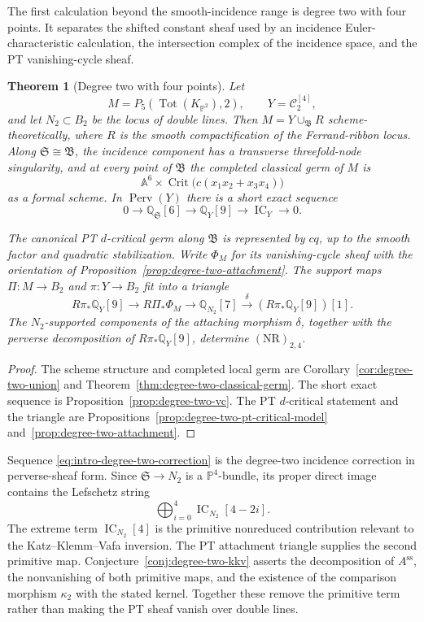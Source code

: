 \documentclass[11pt,reqno]{amsart}
\newtheorem{theorem}{Theorem}[section]
\theoremstyle{definition}
\newcommand{\Q}{\mathbb Q}
\newcommand{\Pp}{\mathbb P}
\newcommand{\IC}{\operatorname{IC}}
\newcommand{\Tot}{\operatorname{Tot}}
\begin{document}
The first calculation beyond the smooth-incidence range is degree two with
four points.  It separates the shifted constant sheaf used by an incidence
Euler-characteristic calculation, the intersection complex of the incidence
space, and the PT vanishing-cycle sheaf.

\begin{theorem}[Degree two with four points]
\label{thm:intro-degree-two}
Let
\[
 M=P_5(\Tot(K_{\Pp^2}),2),\qquad Y=\mathcal C_2^{[4]},
\]
and let $N_2\subset B_2$ be the locus of double lines.
Then $M=Y\cup_{\mathfrak B}R$ scheme-theoretically, where $R$ is the smooth
compactification of the Ferrand-ribbon locus.  Along
$\mathfrak S\cong\mathfrak B$, the incidence component has a transverse
threefold-node singularity, and at every point of $\mathfrak B$ the
completed classical germ of $M$ is
\[
 \mathbb A^6\times
 \operatorname{Crit}\bigl(c(x_1x_2+x_3x_4)\bigr)
\]
as a formal scheme.  In $\operatorname{Perv}(Y)$ there is a short exact sequence
\begin{equation}\label{eq:intro-degree-two-correction}
 0\longrightarrow\Q_{\mathfrak S}[6]
 \longrightarrow\Q_Y[9]
 \longrightarrow\IC_Y\longrightarrow0.
\end{equation}

The canonical PT $d$-critical germ along $\mathfrak B$ is represented by
$cq$, up to the smooth factor and quadratic stabilization.  Write $\Phi_M$
for its vanishing-cycle sheaf with the orientation of
Proposition~\ref{prop:degree-two-attachment}.  The support maps
$\Pi:M\to B_2$ and $\pi:Y\to B_2$ fit into a triangle
\[
 R\pi_*\Q_Y[9]\longrightarrow R\Pi_*\Phi_M
 \longrightarrow\Q_{N_2}[7]
 \xrightarrow{\delta}(R\pi_*\Q_Y[9])[1].
\]
The $N_2$-supported components of the attaching morphism $\delta$, together
with the perverse decomposition of $R\pi_*\Q_Y[9]$, determine
$(\mathrm{NR})_{2,4}$.
\end{theorem}

\begin{proof}
The scheme structure and completed local germ are
Corollary~\ref{cor:degree-two-union} and
Theorem~\ref{thm:degree-two-classical-germ}.  The short exact sequence is
Proposition~\ref{prop:degree-two-vc}.  The PT $d$-critical statement and
the triangle are
Propositions~\ref{prop:degree-two-pt-critical-model}
and~\ref{prop:degree-two-attachment}.
\end{proof}

Sequence \eqref{eq:intro-degree-two-correction} is the degree-two incidence
correction in perverse-sheaf form.  Since
$\mathfrak S\to N_2$ is a $\Pp^4$-bundle, its proper direct image contains
the Lefschetz string
\[
 \bigoplus_{i=0}^4\IC_{N_2}[4-2i].
\]
The extreme term $\IC_{N_2}[4]$ is the primitive nonreduced contribution
relevant to the Katz--Klemm--Vafa inversion.  The PT attachment triangle
supplies the second primitive map.  Conjecture~\ref{conj:degree-two-kkv}
asserts the decomposition of $A^{\mathrm{ss}}$, the nonvanishing of both
primitive maps, and the existence of the comparison morphism $\kappa_2$
with the stated kernel.  Together these remove the primitive term rather
than making the PT sheaf vanish over double lines.
\end{document}

